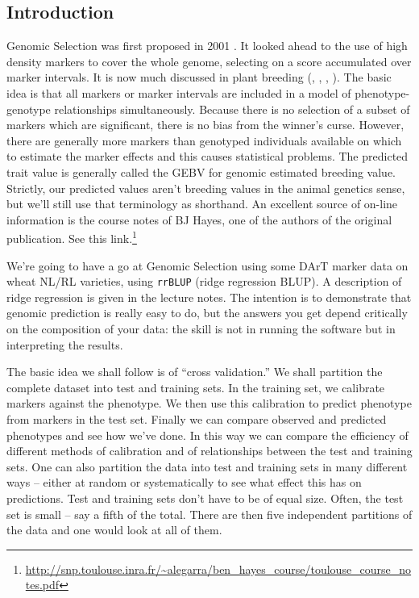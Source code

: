 \documentclass[
]{book}
\renewcommand{\href}[2]{#2\footnote{\url{#1}}}
\begin{document}
\hypertarget{introduction-5}{%
\subsection{Introduction}\label{introduction-5}}

Genomic Selection was first proposed in 2001 \citep{Meuwissen1819}. It looked ahead to the use of high density markers to cover the whole genome, selecting on a score accumulated over marker intervals. It is now much discussed in plant breeding (\citet{Bernardo2007}, \citet{Heffner2009},
\citet{Piepho2009}, \citet{Jannink2010}). The basic idea is that all markers or marker intervals are included in a model of phenotype-genotype relationships simultaneously. Because there is no selection of a subset of markers which are significant, there is no bias from the winner's curse. However, there are generally more markers than genotyped individuals available on which to estimate the marker effects and this causes statistical problems. The predicted
trait value is generally called the GEBV for genomic estimated breeding value. Strictly, our
predicted values aren't breeding values in the animal genetics sense, but we'll still use that terminology as shorthand. An excellent source of on-line information is the course notes of BJ Hayes, one of the authors of the original publication. \href{http://snp.toulouse.inra.fr/~alegarra/ben_hayes_course/toulouse_course_notes.pdf}{See this link.}

We're going to have a go at Genomic Selection using some DArT marker data on wheat
NL/RL varieties, using \texttt{rrBLUP} (ridge regression BLUP). A description of ridge regression is
given in the lecture notes. The intention is to demonstrate that genomic prediction is really
easy to do, but the answers you get depend critically on the composition of your data: the
skill is not in running the software but in interpreting the results.

The basic idea we shall follow is of ``cross validation.'' We shall partition the complete
dataset into test and training sets. In the training set, we calibrate markers against the
phenotype. We then use this calibration to predict phenotype from markers in the test set.
Finally we can compare observed and predicted phenotypes and see how we've done. In this way we can compare the efficiency of different methods of calibration and of relationships between the test and training sets. One can also partition the data into test and training sets in many different ways -- either at random or systematically to see what effect this has on predictions. Test and training sets don't have to be of equal size. Often, the test set is small -- say a fifth of the total. There are then five independent partitions of the data and one would look at all of them.
\end{document}
